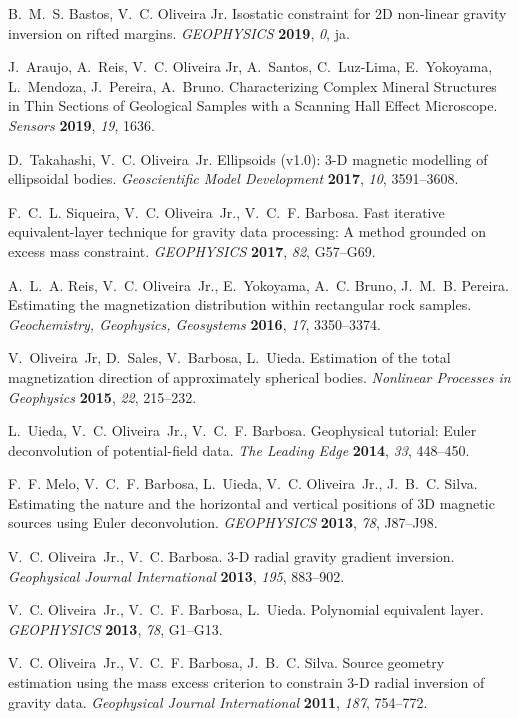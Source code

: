 
\nocite{*}

%
\begin{thebibliography}{10}

B.~M.~S. Bastos, V.~C. Oliveira{ }Jr. Isostatic constraint for 2D non-linear
  gravity inversion on rifted margins. \emph{GEOPHYSICS} \textbf{2019},
  \emph{0}, ja.

J.~Araujo, A.~Reis, V.~C. Oliveira{ }Jr, A.~Santos, C.~Luz-Lima, E.~Yokoyama,
  L.~Mendoza, J.~Pereira, A.~Bruno. Characterizing Complex Mineral Structures
  in Thin Sections of Geological Samples with a Scanning Hall Effect
  Microscope. \emph{Sensors} \textbf{2019}, \emph{19}, 1636.

D.~Takahashi, V.~C. Oliveira~Jr. Ellipsoids (v1.0): 3-{D} magnetic modelling of
  ellipsoidal bodies. \emph{Geoscientific Model Development} \textbf{2017},
  \emph{10}, 3591--3608.

F.~C.~L. Siqueira, V.~C. Oliveira~Jr., V.~C.~F. Barbosa. Fast iterative
  equivalent-layer technique for gravity data processing: {A} method grounded
  on excess mass constraint. \emph{GEOPHYSICS} \textbf{2017}, \emph{82},
  G57--G69.

A.~L.~A. Reis, V.~C. Oliveira~Jr., E.~Yokoyama, A.~C. Bruno, J.~M.~B. Pereira.
  Estimating the magnetization distribution within rectangular rock samples.
  \emph{Geochemistry, Geophysics, Geosystems} \textbf{2016}, \emph{17},
  3350--3374.

V.~Oliveira~Jr, D.~Sales, V.~Barbosa, L.~Uieda. Estimation of the total
  magnetization direction of approximately spherical bodies. \emph{Nonlinear
  Processes in Geophysics} \textbf{2015}, \emph{22}, 215--232.

L.~Uieda, V.~C. Oliveira~Jr., V.~C.~F. Barbosa. Geophysical tutorial: {Euler}
  deconvolution of potential-field data. \emph{The Leading Edge} \textbf{2014},
  \emph{33}, 448--450.

F.~F. Melo, V.~C.~F. Barbosa, L.~Uieda, V.~C. Oliveira~Jr., J.~B.~C. Silva.
  Estimating the nature and the horizontal and vertical positions of 3D
  magnetic sources using {Euler} deconvolution. \emph{GEOPHYSICS}
  \textbf{2013}, \emph{78}, J87--J98.

V.~C. Oliveira~Jr., V.~C. Barbosa. 3-{D} radial gravity gradient inversion.
  \emph{Geophysical Journal International} \textbf{2013}, \emph{195}, 883--902.

V.~C. Oliveira~Jr., V.~C.~F. Barbosa, L.~Uieda. Polynomial equivalent layer.
  \emph{GEOPHYSICS} \textbf{2013}, \emph{78}, G1--G13.

V.~C. Oliveira~Jr., V.~C.~F. Barbosa, J.~B.~C. Silva. Source geometry
  estimation using the mass excess criterion to constrain 3-{D} radial
  inversion of gravity data. \emph{Geophysical Journal International}
  \textbf{2011}, \emph{187}, 754--772.

\end{thebibliography}
